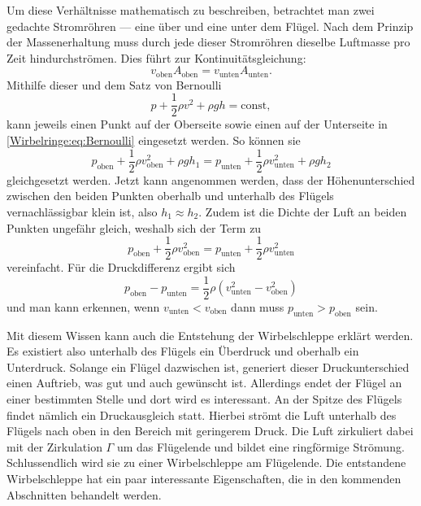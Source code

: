 Um diese Verhältnisse mathematisch zu beschreiben, betrachtet man zwei gedachte Stromröhren --- eine über und eine unter dem Flügel. 
Nach dem Prinzip der Massenerhaltung muss durch jede dieser Stromröhren dieselbe Luftmasse pro Zeit hindurchströmen. Dies führt zur Kontinuitätsgleichung:
\begin{equation*}
v_{\text{oben}}A_{\text{oben}} 
=
v_{\text{unten}}A_{\text{unten}}.
\end{equation*}
Mithilfe dieser und dem Satz von Bernoulli
\begin{equation}
    p+\frac{1}{2}\rho v^2+\rho gh
    =
    \text{const}
    \label{Wirbelringe:eq:Bernoulli},
\end{equation}
kann jeweils einen Punkt auf der Oberseite sowie einen auf der Unterseite in \eqref{Wirbelringe:eq:Bernoulli} eingesetzt werden.
So können sie 
\begin{equation*}
p_{\text{oben}}+\frac{1}{2}\rho v^2_{\text{oben}} + \rho gh_1 
=
p_{\text{unten}}+\frac{1}{2}\rho v^2_{\text{unten}}+\rho gh_2
\end{equation*}
gleichgesetzt werden.
Jetzt kann angenommen werden, dass der Höhenunterschied zwischen den beiden Punkten oberhalb und unterhalb des Flügels vernachlässigbar klein ist, also \(h_1\approx h_2\).
Zudem ist die Dichte der Luft an beiden Punkten ungefähr gleich, weshalb sich der Term zu 
\begin{equation*}
p_{\text{oben}}+\frac{1}{2}\rho v^2_{\text{oben}} 
=
p_{\text{unten}}+\frac{1}{2}\rho v^2_{\text{unten}}
\end{equation*}
vereinfacht.
Für die Druckdifferenz ergibt sich
\begin{equation*}
p_{\text{oben}}-p_{\text{unten}} 
=
\frac{1}{2}\rho( v^2_{\text{unten}}-v^2_{\text{oben}})
\end{equation*}
und man kann erkennen, wenn \(v_{\text{unten}} < v_{\text{oben}}\) dann muss \(p_{\text{unten}} > p_{\text{oben}}\) sein.

Mit diesem Wissen kann auch die Entstehung der Wirbelschleppe erklärt werden. 
Es existiert also unterhalb des Flügels ein Überdruck und oberhalb ein Unterdruck.
Solange ein Flügel dazwischen ist, generiert dieser Druckunterschied einen Auftrieb, was gut und auch gewünscht ist.
Allerdings endet der Flügel an einer bestimmten Stelle und dort wird es interessant.
An der Spitze des Flügels findet nämlich ein Druckausgleich statt.
Hierbei strömt die Luft unterhalb des Flügels nach oben in den Bereich mit geringerem Druck. 
Die Luft zirkuliert dabei mit der Zirkulation \(\Gamma\) um das Flügelende und bildet eine ringförmige Strömung.
Schlussendlich wird sie zu einer Wirbelschleppe am Flügelende.
Die entstandene Wirbelschleppe hat ein paar interessante Eigenschaften, die in den kommenden Abschnitten behandelt werden.

